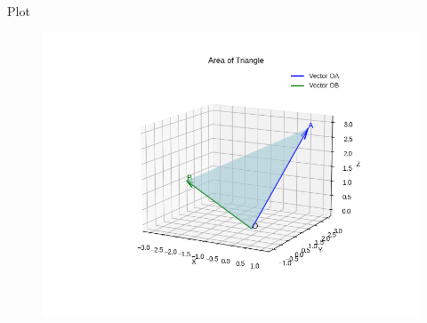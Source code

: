 \documentclass{beamer}
\begin{document}
\begin{frame}{Plot}
    \begin{figure}
        \centering
        \includegraphics[width=0.79\linewidth]{figs/Figure_1.png}
        \caption{}
        \label{fig:fig1}
    \end{figure}
\end{frame}
\end{document}
